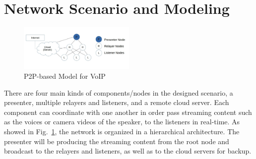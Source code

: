 \section{Network Scenario and Modeling}

\begin{figure}[h!]  
  \centering  
    \includegraphics[width=0.5\textwidth]{figures/model1_test2.jpg}
  \caption{P2P-based Model for VoIP}
  \label{fig:mod1}  
\end{figure}
There are four main kinds of components/nodes in the designed scenario, a 
presenter, multiple relayers and listeners, and a remote cloud server. Each 
component can coordinate with one another in order pass streaming content such 
as the voices or camera videos of the speaker, to the listeners in real-time. As 
showed in Fig.~\ref{fig:mod1}, the network is organized in a hierarchical 
architecture. The presenter will be producing the streaming content from the 
root node and broadcast to the relayers and listeners, as well as to 
the cloud servers for backup. 

